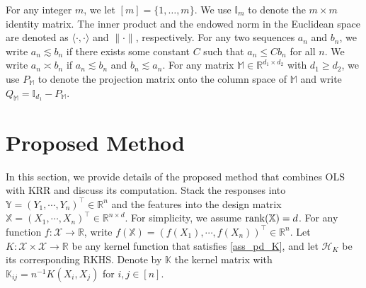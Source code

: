 \documentclass[11pt,twoside]{article}
\def\KK{\mathbb{K}}
\def\II{\mathbb{I}}
\def\YY{\mathbb{Y}}
\def\XX{\mathbb{X}}
\def\RR{\mathbb{R}}
\def\MM{\mathbb{M}}
\def\cH{\mathcal H}
\def\cX{\mathcal{X}}
\def\T{\top}
\newcommand{\rank}{\ensuremath{{\rm rank}}}
\begin{document}
For any integer $m$, we let $[m] = \{1,\ldots,m\}$.  
We use $\II_m$  to denote the $m\times m$ identity matrix.
The inner product and the endowed norm in the Euclidean space are denoted as  $\langle\cdot,\cdot\rangle$ and $\|\cdot\|$, respectively.
For any two sequences $a_n$ and $b_n$,  we write $a_n \lesssim b_n$ if there exists some constant $C$ such that $a_n\le C b_n$ for all $n$. We write $a_n\asymp b_n$ if $a_n\lesssim b_n$ and $b_n\lesssim a_n$.  
For any matrix $\MM \in \RR^{d_1\times d_2}$ with $d_1\ge d_2$, we use  $P_ \MM $ to denote the projection matrix onto the column space of $\MM$ and write $Q_{\MM} = \II_{d_1}-P_{\MM}$.
 

\section{Proposed Method}\label{sec_method_krr}

In this section, we provide details of the proposed method that combines OLS with KRR and discuss its computation.  Stack the responses into   $\YY=(Y_1,\cdots,Y_n)^\T\in \RR^n$ and the features into the design matrix $\XX= (X_1,\cdots , X_n)^\T \in \RR^{n\times d}$. For simplicity, we assume $\rank(\XX)=d$.  For any function $f: \cX \to \RR$, write $f(\XX) =( f(X_1),\cdots,f(X_n))^\T \in \RR^n $. Let $K: \cX \times \cX \to \RR$ be any kernel function that satisfies \cref{ass_pd_K}, and let $\cH_K$ be its corresponding RKHS. Denote by  $\KK$ the  kernel matrix with  $\KK_{ij} = n^{-1} K  (X_i,X_j)$ for $i, j\in [n]$. 
\end{document}
